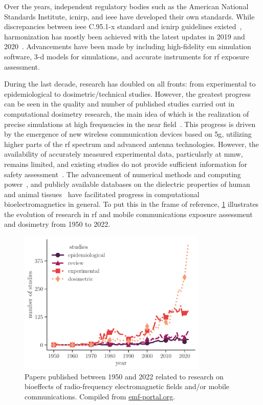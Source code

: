 Over the years, independent regulatory bodies such as the American National Standards Institute, \gls{icnirp}, and \gls{ieee} have developed their own standards.
While discrepancies between \gls{ieee} C.95.1-x standard and \gls{icnirp} guidelines existed~\cite{Repacholi2017history}, harmonization has mostly been achieved with the latest updates in 2019 and 2020~\cite{Foster2022Three}.
Advancements have been made by including high-fidelity \gls{em} simulation software, \gls{3-d} models for simulations, and accurate instruments for \gls{rf} exposure assessment.

During the last decade, research has doubled on all fronts: from experimental to epidemiological to dosimetric/technical studies.
However, the greatest progress can be seen in the quality and number of published studies carried out in computational dosimetry research, the main idea of which is the realization of precise simulations at high frequencies in the near field~\cite{Diao2021Effect}.
This progress is driven by the emergence of new wireless communication devices based on \gls{5g}, utilizing higher parts of the \gls{rf} spectrum and advanced antenna technologies.
However, the availability of accurately measured experimental data, particularly at \gls{mmw}, remains limited, and existing studies do not provide sufficient information for safety assessment~\cite{Simkó20195G}.
The advancement of numerical methods and computing power~\cite{Poljak2018conformal}, and publicly available databases on the dielectric properties of human and animal tissues~\cite{Gabriel1996Compilation} have facilitated progress in computational bioelectromagnetics in general.
To put this in the frame of reference, \cref{fig:research_compilation} illustrates the evolution of research in \gls{rf} and mobile communications exposure assessment and dosimetry from 1950 to 2022.
\begin{figure}[t]
    \centering
    \includegraphics[width=0.8\textwidth]{artwork/research_compilation.pdf}
    \caption{Papers published between 1950 and 2022 related to research on bioeffects of radio-frequency electromagnetic fields and/or mobile communications.
    Compiled from \href{http://www.emf-portal.org}{\url{emf-portal.org}}.}
    \label{fig:research_compilation}
\end{figure}

